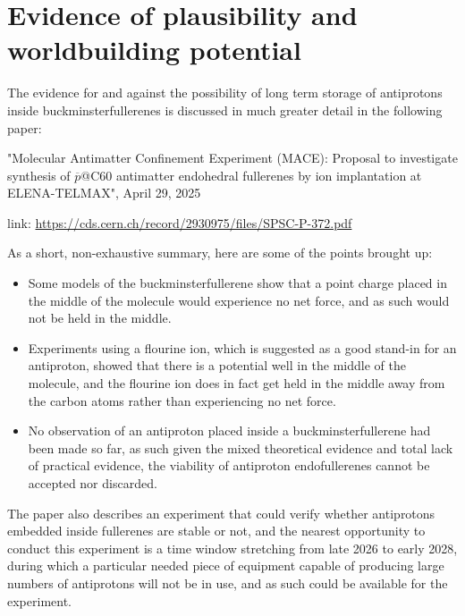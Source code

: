 \documentclass[a4paper]{article}
\begin{document}
	\vfill
	
	\tableofcontents
	
	\pagebreak
	
	\section{Evidence of plausibility and worldbuilding potential}
	
	The evidence for and against the possibility of long term storage of antiprotons inside buckminsterfullerenes is discussed in much greater detail in the following paper:
	
	\medskip
	
	\noindent "Molecular Antimatter Confinement Experiment (MACE): Proposal to investigate synthesis of $\overline{p}$@C60 antimatter endohedral fullerenes by ion implantation at ELENA-TELMAX", April 29, 2025
	
	link: \href{https://cds.cern.ch/record/2930975/files/SPSC-P-372.pdf}{https://cds.cern.ch/record/2930975/files/SPSC-P-372.pdf}
	
	\medskip
	
	As a short, non-exhaustive summary, here are some of the points brought up:
	
	\begin{itemize}
		\item Some models of the buckminsterfullerene show that a point charge placed in the middle of the molecule would experience no net force, and as such would not be held in the middle.
		
		\item Experiments using a flourine ion, which is suggested as a good stand-in for an antiproton, showed that there is a potential well in the middle of the molecule, and the flourine ion does in fact get held in the middle away from the carbon atoms rather than experiencing no net force.
		
		\item No observation of an antiproton placed inside a buckminsterfullerene had been made so far, as such given the mixed theoretical evidence and total lack of practical evidence, the viability of antiproton endofullerenes cannot be accepted nor discarded.
	\end{itemize}
	
	The paper also describes an experiment that could verify whether antiprotons embedded inside fullerenes are stable or not, and the nearest opportunity to conduct this experiment is a time window stretching from late 2026 to early 2028, during which a particular needed piece of equipment capable of producing large numbers of antiprotons will not be in use, and as such could be available for the experiment.
	
\end{document}
